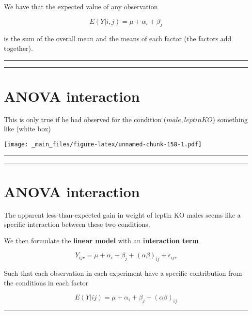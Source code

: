 \documentclass[
]{book}
\begin{document}
We have that the expected value of any observation

\[E(Y|i,j)=\mu + \alpha_i+ \beta_j\]

is the sum of the overall mean and the means of each factor (the factors add together).

\begin{center}\rule{0.5\linewidth}{0.5pt}\end{center}

\begin{center}\rule{0.5\linewidth}{0.5pt}\end{center}

\hypertarget{anova-interaction-1}{%
\section{ANOVA interaction}\label{anova-interaction-1}}

This is only true if he had observed for the condition (\(male, leptinKO\)) something like (white box)

\texttt{[image: \_main\_files/figure-latex/unnamed-chunk-158-1.pdf]}

\begin{center}\rule{0.5\linewidth}{0.5pt}\end{center}

\begin{center}\rule{0.5\linewidth}{0.5pt}\end{center}

\hypertarget{anova-interaction-2}{%
\section{ANOVA interaction}\label{anova-interaction-2}}

The apparent less-than-expected gain in weight of leptin KO males seems like a specific interaction between these two conditions.

We then formulate the \textbf{linear model} with an \textbf{interaction term}

\[Y_{ijr} = \mu + \alpha_i + \beta_j + (\alpha\beta)_{ij} + \epsilon_{ijr}\]

Such that each observation in each experiment have a specific contribution from the conditions in each factor

\[E(Y|ij)=\mu + \alpha_i+ \beta_j + (\alpha\beta)_{ij}\]

\begin{center}\rule{0.5\linewidth}{0.5pt}\end{center}
\end{document}

